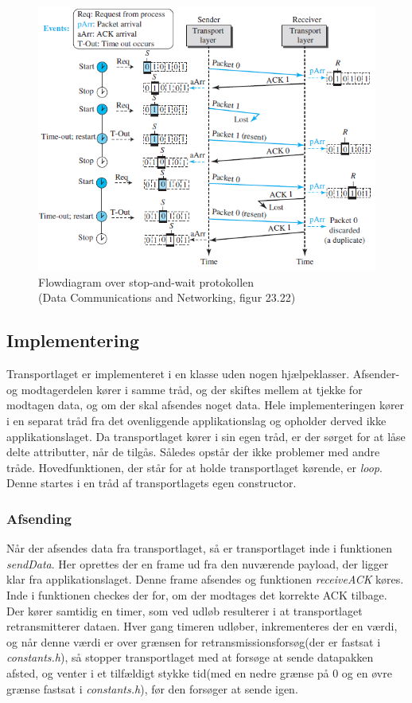 \begin{figure}[h]
\centering
\includegraphics[scale=0.75]{Billeder/StopAndWaitFlow.png}
\caption{Flowdiagram over stop-and-wait protokollen \\(Data Communications and Networking, figur 23.22)
\label{StopAndWaitFlow}}
\end{figure}

\subsection{Implementering}
Transportlaget er implementeret i en klasse uden nogen hjælpeklasser. Afsender-og modtagerdelen kører i samme tråd, og der skiftes mellem at tjekke for modtagen data, og om der skal afsendes noget data. Hele implementeringen kører i en separat tråd fra det ovenliggende applikationslag og opholder derved ikke applikationslaget. Da transportlaget kører i sin egen tråd, er der sørget for at låse delte attributter, når de tilgås. Således opstår der ikke problemer med andre tråde. Hovedfunktionen, der står for at holde transportlaget kørende, er \textit{loop}. Denne startes i en tråd af transportlagets egen constructor.

\subsubsection{Afsending}
Når der afsendes data fra transportlaget, så er transportlaget inde i funktionen \textit{sendData}. Her oprettes der en frame ud fra den nuværende payload, der ligger klar fra applikationslaget. Denne frame afsendes og funktionen \textit{receiveACK} køres. Inde i funktionen checkes der for, om der modtages det korrekte ACK tilbage. Der kører samtidig en timer, som ved udløb resulterer i at transportlaget retransmitterer dataen. Hver gang timeren udløber, inkrementeres der en værdi, og når denne værdi er over grænsen for retransmissionsforsøg(der er fastsat i \textit{constants.h}), så stopper transportlaget med at forsøge at sende datapakken afsted, og venter i et tilfældigt stykke tid(med en nedre grænse på 0 og en øvre grænse fastsat i \textit{constants.h}), før den forsøger at sende igen.


